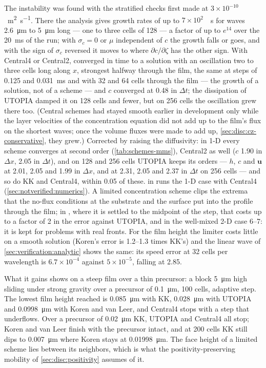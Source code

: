 The instability was found with the stratified checks first made at
$3\times10^{-10}$~\si{\metre\squared\per\second}. There the analysis gives
growth rates of up to $7\times10^{2}$~\si{\per\second} for waves
\SI{2.6}{\micro\metre} to \SI{5}{\micro\metre} long --- one to three cells of
128 --- a factor of up to $e^{14}$ over the \SI{20}{\milli\second} of the
run; with $\sigma_c = 0$ or $\mu$ independent of $c$ the growth falls or
goes, and with the sign of $\sigma_c$ reversed it moves to where
$\partial c/\partial\zeta$ has the other sign. With Central4 or Central2,
 converged in time to a solution with an oscillation two
to three cells long along $x$, strongest halfway through the film, the same
at steps of 0.125 and \SI{0.031}{\milli\second} and with 32 and 64 cells
through the film --- the growth of a solution, not of a scheme --- and $c$
converged at 0.48 in $\Delta t$; the dissipation of UTOPIA damped it on 128
cells and fewer, but on 256 cells the oscillation grew there too. (Central
schemes had stayed smooth earlier in development only while the layer
velocities of the concentration equation did not add up to the film's flux
on the shortest waves; once the volume fluxes were made to add up,
\cref{sec:disc:cz-conservative}, they grew.) Corrected by raising the
diffusivity: in 1-D every scheme converges at second order
(\cref{tab:schemes-mms}), Central2 as well ($c$ 1.90 in $\Delta x$, 2.05 in $\Delta t$), and on 128 and 256 cells
UTOPIA keeps its orders --- $h$, $c$ and $\mathbf u$ at 2.01, 2.05 and 1.99
in $\Delta x$, and at 2.31, 2.05 and 2.37 in $\Delta t$ on 256 cells ---
and so do KK and Central4, within 0.05 of these.
 in  runs the 1-D case with
Central4 (\cref{sec:notverified:numerics}). A
limited concentration scheme clips the extrema that the no-flux conditions at
the substrate and the surface put into the profile through the film; in
, where it is settled to the midpoint of the step, that costs up
to a factor of 2 in the error against UTOPIA, and in the well-mixed 2-D
case 6--7: it is kept for problems with real fronts. For the film
height the limiter costs little on a smooth solution (Koren's error is
1.2--1.3 times KK's) and the linear wave of \cref{sec:verification:analytic}
shows the same: its speed error at 32 cells per wavelength is
$6.7\times10^{-4}$ against $5\times10^{-5}$, falling at 2.85.

What it gains shows on a steep film over a thin precursor: a block
\SI{5}{\micro\metre} high sliding under strong gravity over a precursor of
\SI{0.1}{\micro\metre}, 100 cells, adaptive step. The lowest film height
reached is \SI{0.085}{\micro\metre} with KK, \SI{0.028}{\micro\metre} with
UTOPIA and \SI{0.0998}{\micro\metre} with Koren and van Leer, and Central4
stops with a step that underflows. Over a precursor of \SI{0.02}{\micro\metre}
KK, UTOPIA and Central4 all stop; Koren and van Leer finish with the precursor
intact, and at 200 cells KK still dips to \SI{0.007}{\micro\metre} where Koren
stays at \SI{0.01998}{\micro\metre}. The face height of a limited scheme lies
between its neighbors, which is what the positivity-preserving mobility of
\cref{sec:disc:positivity} assumes of it.

